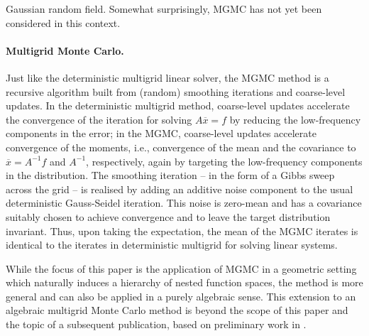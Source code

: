 \documentclass[11pt,english]{article}
\theoremstyle{plain}
\theoremstyle{plain}
\theoremstyle{plain}
\theoremstyle{plain}
\numberwithin{equation}{section}
\newcommand{\rev}[1]{#1}
\begin{document}
Gaussian random field. Somewhat surprisingly, MGMC has not yet been considered in this context.\vspace{-1ex}
\paragraph{Multigrid Monte Carlo.}
Just like the deterministic multigrid linear solver, the MGMC method is a recursive algorithm built from (random) smoothing iterations and coarse-level updates. In the deterministic multigrid method, coarse-level updates accelerate the convergence of the iteration for solving $A \overline{x}=f$ by reducing the low-frequency components in the error; in the MGMC, coarse-level updates accelerate convergence of the moments, i.e., convergence of the mean and the covariance to $\overline{x}=A^{-1}f$ and $A^{-1}$, respectively,  again by targeting the low-frequency components in the distribution. The smoothing iteration -- in the form of a Gibbs sweep across the grid -- is realised by adding an additive noise component to the usual deterministic Gauss-Seidel iteration. This noise is zero-mean and has a covariance suitably chosen to achieve convergence and to leave the target distribution invariant. Thus, upon taking the expectation, the mean of the MGMC iterates is identical to the iterates in deterministic multigrid for solving linear systems.

\rev{While the focus of this paper is the application of MGMC in a geometric setting which naturally induces a hierarchy of nested function spaces, the method is more general and can also be applied in a purely algebraic sense. This extension to an algebraic multigrid Monte Carlo method is beyond the scope of this paper and the topic of a subsequent publication, based on preliminary work in \cite{friess2024}.}\vspace{-1ex}
\end{document}
